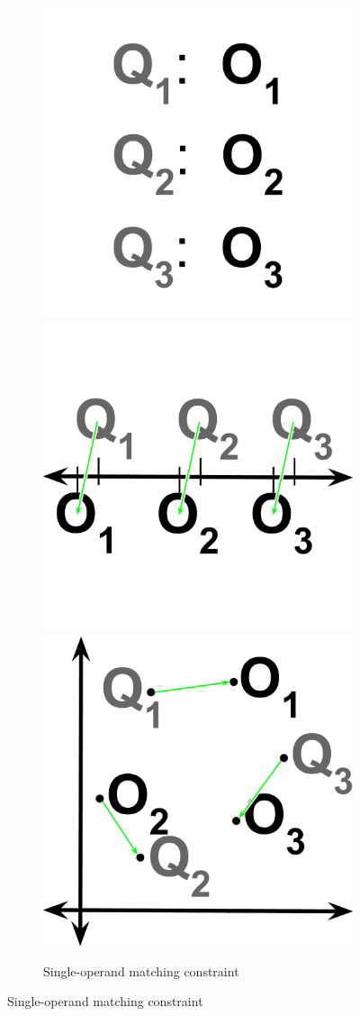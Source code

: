 \begin{figure}[!htbp]
\begin{center}

\begin{subfigure}[b]{\columnwidth}
\centering
\includegraphics[width=0.33\columnwidth]{img/1d-2d-single-double/single}%
\includegraphics[width=0.33\columnwidth]{img/1d-2d-single-double/1d-single}%
\includegraphics[width=0.33\columnwidth]{img/1d-2d-single-double/2d-single}
\caption{
Single-operand matching constraint
}
\label{fig:single}
\end{subfigure}


\end{center}
\end{figure}
